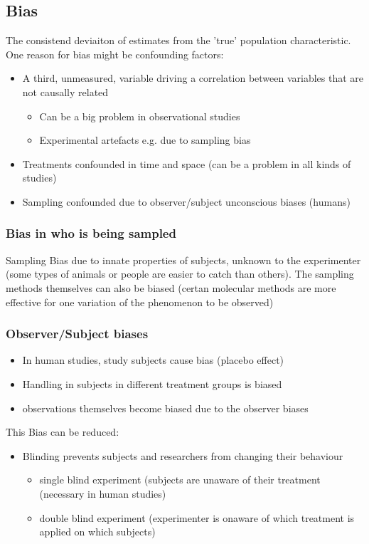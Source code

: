 \documentclass{article}
\begin{document}
\subsection{Bias}
The consistend deviaiton of estimates from the 'true' population characteristic.
One reason for bias might be confounding factors:
\begin{itemize}
\item A third, unmeasured, variable driving a correlation between variables that are not causally related
	\begin{itemize}
	\item Can be a big problem in observational studies
	\item Experimental artefacts e.g. due to sampling bias
	\end{itemize}
\item Treatments confounded in time and space (can be a problem in all kinds of studies)
\item Sampling confounded due to observer/subject unconscious biases (humans)
\end{itemize}

\subsubsection{Bias in who is being sampled}
Sampling Bias due to innate properties of subjects, unknown to the experimenter (some types of animals or people are easier to catch than others). The sampling methods themselves can also be biased (certan molecular methods are more effective for one variation of the phenomenon to be observed)

\subsubsection{Observer/Subject biases}
\begin{itemize}
\item In human studies, study subjects cause bias (placebo effect)
\item Handling in subjects in different treatment groups is biased
\item observations themselves become biased due to the observer biases
\end{itemize}
This Bias can be reduced:
\begin{itemize}
\item Blinding prevents subjects and researchers from changing their behaviour
	\begin{itemize}
	\item single blind experiment (subjects are unaware of their treatment (necessary in human studies)
	\item double blind experiment (experimenter is onaware of which treatment is applied on which subjects)
	\end{itemize}
\end{itemize}
\end{document}
